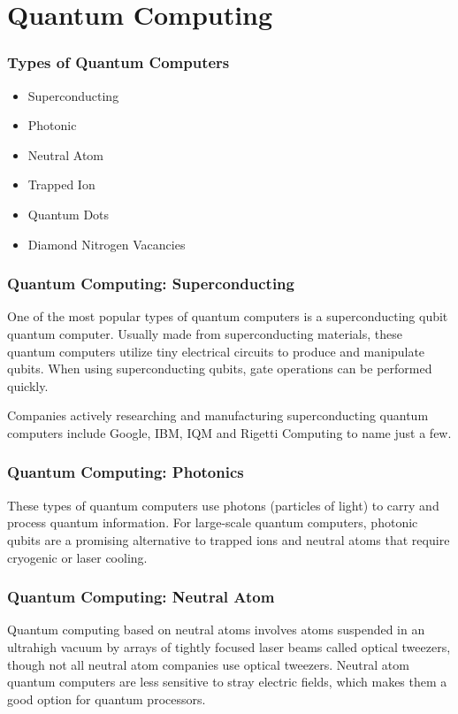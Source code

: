 \documentclass{beamer}
\begin{document}
\section{Quantum Computing}

\begin{frame}\frametitle{Types of Quantum Computers}
\begin{itemize}
\item Superconducting
\item Photonic
\item Neutral Atom
\item Trapped Ion
\item Quantum Dots
\item Diamond Nitrogen Vacancies
\end{itemize}
\end{frame}

\begin{frame}\frametitle{Quantum Computing: Superconducting}
One of the most popular types of quantum computers is a superconducting qubit quantum computer. Usually made from superconducting materials, these quantum computers utilize tiny electrical circuits to produce and manipulate qubits. When using superconducting qubits, gate operations can be performed quickly.

Companies actively researching and manufacturing superconducting quantum computers include Google, IBM, IQM and Rigetti Computing to name just a few.
\end{frame}


\begin{frame}\frametitle{Quantum Computing: Photonics}
These types of quantum computers use photons (particles of light) to carry and process quantum information. For large-scale quantum computers, photonic qubits are a promising alternative to trapped ions and neutral atoms that require cryogenic or laser cooling.
\end{frame}


\begin{frame}\frametitle{Quantum Computing: Neutral Atom}
Quantum computing based on neutral atoms involves atoms suspended in an ultrahigh vacuum by arrays of tightly focused laser beams called optical tweezers, though not all neutral atom companies use optical tweezers. Neutral atom quantum computers are less sensitive to stray electric fields, which makes them a good option for quantum processors.
\end{frame}
\end{document}
